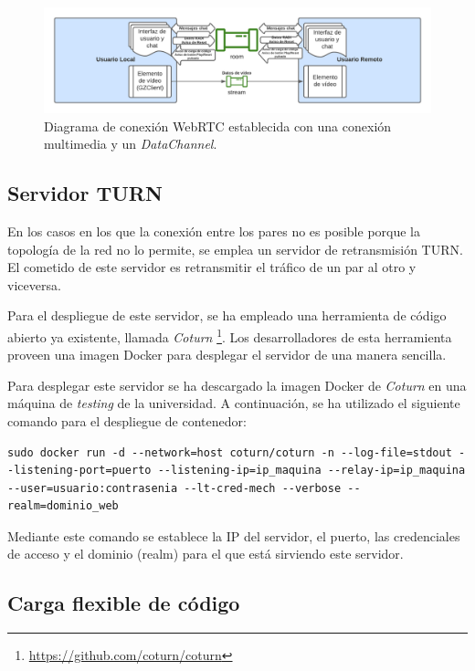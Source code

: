 \documentclass[a4paper, 12pt]{book}
\begin{document}
\begin{figure}[H]
	\centering
    \includegraphics[width=16cm]{img/diagrama_conexion_webrtc.png}
    \caption{Diagrama de conexión WebRTC establecida con una conexión multimedia y un \emph{DataChannel}.}
    \label{figura:diagrama_conexion_webrtc}
\end{figure}

\subsection{Servidor TURN}

En los casos en los que la conexión entre los pares no es posible porque la topología de la red no lo permite, se emplea un servidor de retransmisión TURN. El cometido de este servidor es retransmitir el tráfico de un par al otro y viceversa.

Para el despliegue de este servidor, se ha empleado una herramienta de código abierto ya existente, llamada \emph{Coturn} \footnote{\url{https://github.com/coturn/coturn}}. Los desarrolladores de esta herramienta proveen una imagen Docker para desplegar el servidor de una manera sencilla.

Para desplegar este servidor se ha descargado la imagen Docker de \emph{Coturn} en una máquina de \emph{testing} de la universidad. A continuación, se ha utilizado el siguiente comando para el despliegue de contenedor: 

\begin{lstlisting}[basicstyle=\ttfamily\scriptsize]
sudo docker run -d --network=host coturn/coturn -n --log-file=stdout --listening-port=puerto --listening-ip=ip_maquina --relay-ip=ip_maquina --user=usuario:contrasenia --lt-cred-mech --verbose --realm=dominio_web
\end{lstlisting}

Mediante este comando se establece la IP del servidor, el puerto, las credenciales de acceso y el dominio (realm) para el que está sirviendo este servidor.

\subsection{Carga flexible de código}
\end{document}
